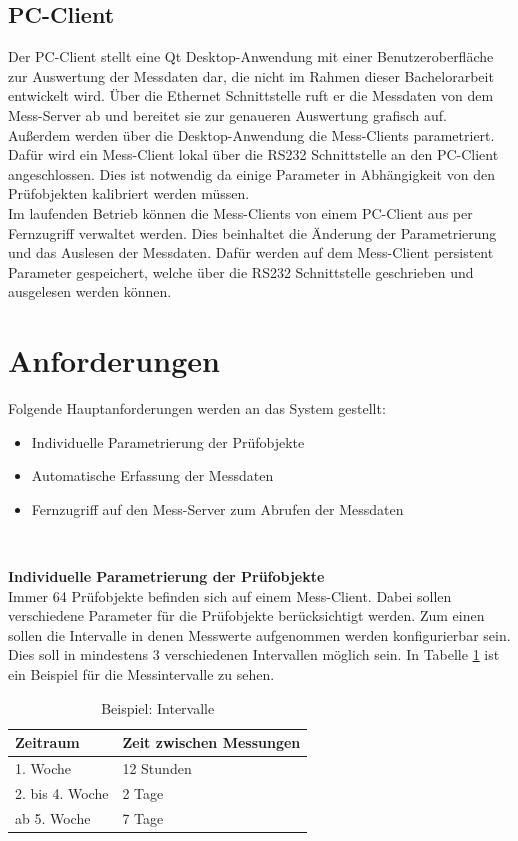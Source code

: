 \subsection{PC-Client}
\label{section_PC-Client}
Der PC-Client stellt eine Qt Desktop-Anwendung mit einer Benutzeroberfläche zur Auswertung der Messdaten dar, die nicht im Rahmen dieser Bachelorarbeit entwickelt wird. Über die Ethernet Schnittstelle ruft er die Messdaten von dem Mess-Server ab und bereitet sie zur genaueren Auswertung grafisch auf.\\
Außerdem werden über die Desktop-Anwendung die Mess-Clients parametriert. Dafür wird ein Mess-Client lokal über die RS232 Schnittstelle an den PC-Client angeschlossen. Dies ist notwendig da einige Parameter in Abhängigkeit von den Prüfobjekten kalibriert werden müssen.\\
Im laufenden Betrieb können die Mess-Clients von einem PC-Client aus per Fernzugriff verwaltet werden. Dies beinhaltet die Änderung der Parametrierung und das Auslesen der Messdaten. Dafür werden auf dem Mess-Client persistent Parameter gespeichert, welche über die RS232 Schnittstelle geschrieben und ausgelesen werden können.



\section{Anforderungen}
Folgende Hauptanforderungen werden an das System gestellt:
\begin{itemize}
\item Individuelle Parametrierung der Prüfobjekte
\item Automatische Erfassung der Messdaten
\item Fernzugriff auf den Mess-Server zum Abrufen der Messdaten
\end{itemize}
\ 

\textbf{Individuelle Parametrierung der Prüfobjekte}\\
Immer 64 Prüfobjekte befinden sich auf einem Mess-Client. Dabei sollen verschiedene Parameter für die Prüfobjekte berücksichtigt werden. 
Zum einen sollen die Intervalle in denen Messwerte aufgenommen werden konfigurierbar sein. Dies soll in mindestens 3 verschiedenen Intervallen möglich sein. In Tabelle \ref{table_Intervalle} ist ein Beispiel für die Messintervalle zu sehen. 

 
\begin{table}[H]
\begin{center}
\begin{tabular}{|l|l|}\hline
Zeitraum & Zeit zwischen Messungen \\ \hline
1. Woche & 12 Stunden\\ 
2. bis 4. Woche & 2 Tage\\ 
ab 5. Woche & 7 Tage\\ \hline
\end{tabular}
\caption{Beispiel: Intervalle}
\label{table_Intervalle}
\end{center}
\end{table}



